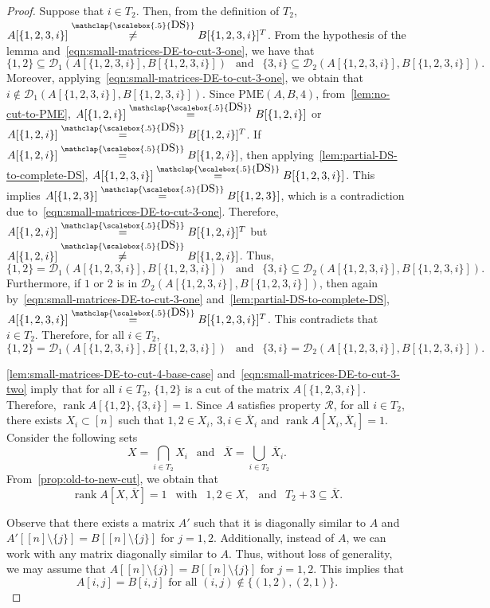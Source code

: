 \documentclass[11pt,letterpaper]{article}
\DeclareMathOperator*{\rank}{rank}
\newcommand{\comp}[1]{\overline{#1}}
\newcommand{\DS}{\stackrel{\mathclap{\scalebox{.5}{\mbox{DS}}}}{=}}
\newcommand{\nDS}{\stackrel{\mathclap{\scalebox{.5}{\mbox{DS}}}}{\neq}}
\newcommand{\kPME}[3]{\mathrm{PME}(#1, #2, #3)}
\newcommand{\nsubset}[1]{[n]\setminus\{#1\}}
\newcommand{\calD}{\mathcal{D}}
\newcommand{\prop}{\mathcal{R}}
\begin{document}
{{{\begin{proof}
Suppose that $i\in T_2$. Then, from the definition of $T_2$, $A[\{1,2,3,i\}]\nDS B[\{1,2,3,i\}]^T$.  From the hypothesis of the lemma and~\cref{eqn:small-matrices-DE-to-cut-3-one}, we have that $$\{1,2\}\subseteq \calD_1(A[\{1,2,3,i\}], B[\{1,2,3,i\}])\ \ \text{ and }\ \ \{3,i\}\subseteq\calD_2(A[\{1,2,3,i\}], B[\{1,2,3,i\}]).$$ Moreover, applying~\cref{eqn:small-matrices-DE-to-cut-3-one}, we obtain that $i\notin\calD_1(A[\{1,2,3,i\}], B[\{1,2,3,i\}])$. Since $\kPME{A}{B}{4}$, from~\cref{lem:no-cut-to-PME}, $A[\{1,2,i\}]\DS B[\{1,2,i\}]$ or $A[\{1,2,i\}]\DS B[\{1,2,i\}]^T$. If $A[\{1,2,i\}]\DS B[\{1,2,i\}]$, then applying~\cref{lem:partial-DS-to-complete-DS}, $A[\{1,2,3,i\}]\DS B[\{1,2,3,i\}]$. This implies $A[\{1,2,3\}]\DS B[\{1,2,3\}]$, which is a contradiction due to~\cref{eqn:small-matrices-DE-to-cut-3-one}. Therefore, $A[\{1,2,i\}]\DS B[\{1,2,i\}]^T$ but $A[\{1,2,i\}]\nDS B[\{1,2,i\}]$. Thus, $$\{1,2\}=\calD_1(A[\{1,2,3,i\}], B[\{1,2,3,i\}])\ \ \text{ and }\ \ \{3, i\}\subseteq \calD_2(A[\{1,2,3,i\}], B[\{1,2,3,i\}]).$$ Furthermore, if $1$ or $2$ is in $ \calD_2(A[\{1,2,3,i\}], B[\{1,2,3,i\}])$, then again by~\cref{eqn:small-matrices-DE-to-cut-3-one} and~\cref{lem:partial-DS-to-complete-DS}, $A[\{1,2,3,i\}]\DS B[\{1,2,3,i\}]^T$. This contradicts that $i\in T_2$. Therefore, for all $i\in T_2$,
\begin{equation}
\label{eqn:small-matrices-DE-to-cut-3-two}
\{1,2\}=\calD_1(A[\{1,2,3,i\}], B[\{1,2,3,i\}])\ \ \text{ and }\ \ \{3,i\}=\calD_2(A[\{1,2,3,i\}], B[\{1,2,3,i\}]).
\end{equation}


\cref{lem:small-matrices-DE-to-cut-4-base-case} and~\cref{eqn:small-matrices-DE-to-cut-3-two} imply that for all $i\in T_2$, $\{1,2\}$ is a cut of the matrix $A[\{1,2,3,i\}]$. Therefore, $\rank A[\{1,2\}, \{3, i\}]=1$. Since $A$ satisfies property $\prop$, for all $i\in T_2$, there exists $X_i\subset[n]$ such that $1,2\in X_i$, $3, i\in \comp{X}_i$ and $\rank A[X_i, \comp{X}_i]=1$. Consider the following sets $$X=\bigcap_{i\in T_2}X_i\:\: \text{ and }\:\: \comp{X}=\bigcup_{i\in T_2}\comp{X}_i.$$
From~\cref{prop:old-to-new-cut}, we obtain that 
\begin{equation}
\label{eqn:small-matrices-DE-to-cut-3-three}
\rank A[X, \comp{X}]=1 \:\:\text{ with }\:\: 1, 2\in X,\: \: \text{ and }\:\: T_2+3\subseteq \comp{X}.
\end{equation}


Observe that there exists a matrix $A'$ such that it is diagonally similar to $A$ and $A'[\nsubset{j}]=B[\nsubset{j}]$ for $j=1,2$. Additionally, instead of $A$, we can work with any matrix diagonally similar to $A$. Thus, without loss of generality, we may assume that $A[\nsubset{j}]=B[\nsubset{j}]$ for $j=1,2$. This implies that $$A[i,j]=B[i,j] \text{ for all } (i,j)\notin\{(1,2), (2,1)\}.$$



\end{proof}}}}
\end{document}
